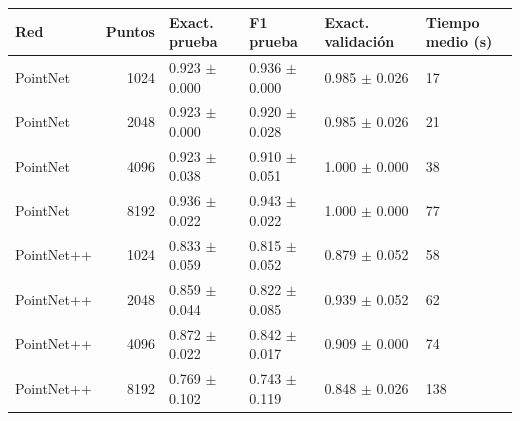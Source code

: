 \begin{tabular}{lrllll}
\toprule
Red & Puntos & Exact. prueba & F1 prueba & Exact. validación & Tiempo medio (s) \\
\midrule
PointNet & 1024 & 0.923 $\pm$ 0.000 & 0.936 $\pm$ 0.000 & 0.985 $\pm$ 0.026 & 17 \\
PointNet & 2048 & 0.923 $\pm$ 0.000 & 0.920 $\pm$ 0.028 & 0.985 $\pm$ 0.026 & 21 \\
PointNet & 4096 & 0.923 $\pm$ 0.038 & 0.910 $\pm$ 0.051 & 1.000 $\pm$ 0.000 & 38 \\
PointNet & 8192 & 0.936 $\pm$ 0.022 & 0.943 $\pm$ 0.022 & 1.000 $\pm$ 0.000 & 77 \\
PointNet++ & 1024 & 0.833 $\pm$ 0.059 & 0.815 $\pm$ 0.052 & 0.879 $\pm$ 0.052 & 58 \\
PointNet++ & 2048 & 0.859 $\pm$ 0.044 & 0.822 $\pm$ 0.085 & 0.939 $\pm$ 0.052 & 62 \\
PointNet++ & 4096 & 0.872 $\pm$ 0.022 & 0.842 $\pm$ 0.017 & 0.909 $\pm$ 0.000 & 74 \\
PointNet++ & 8192 & 0.769 $\pm$ 0.102 & 0.743 $\pm$ 0.119 & 0.848 $\pm$ 0.026 & 138 \\
\bottomrule
\end{tabular}
